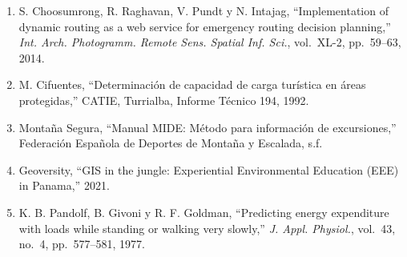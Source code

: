 \documentclass[10pt,letterpaper,twocolumn]{article}
\begin{document}
{\begin{enumerate}
  \item S. Choosumrong, R. Raghavan, V. Pundt y N. Intajag,
        ``Implementation of dynamic routing as a web service for
        emergency routing decision planning,'' \textit{Int. Arch.
        Photogramm. Remote Sens. Spatial Inf. Sci.}, vol.~XL-2,
        pp.~59--63, 2014.

  \item M. Cifuentes, ``Determinaci\'{o}n de capacidad de carga
        tur\'{i}stica en \'{a}reas protegidas,'' CATIE, Turrialba,
        Informe T\'{e}cnico 194, 1992.

  \item Monta\~{n}a Segura, ``Manual MIDE: M\'{e}todo para
        informaci\'{o}n de excursiones,'' Federaci\'{o}n Espa\~{n}ola de
        Deportes de Monta\~{n}a y Escalada, s.f.

  \item Geoversity, ``GIS in the jungle: Experiential Environmental
        Education (EEE) in Panama,'' 2021.

  \item K. B. Pandolf, B. Givoni y R. F. Goldman, ``Predicting energy
        expenditure with loads while standing or walking very slowly,''
        \textit{J. Appl. Physiol.}, vol.~43, no.~4, pp.~577--581, 1977.

\end{enumerate}
}
\end{document}
